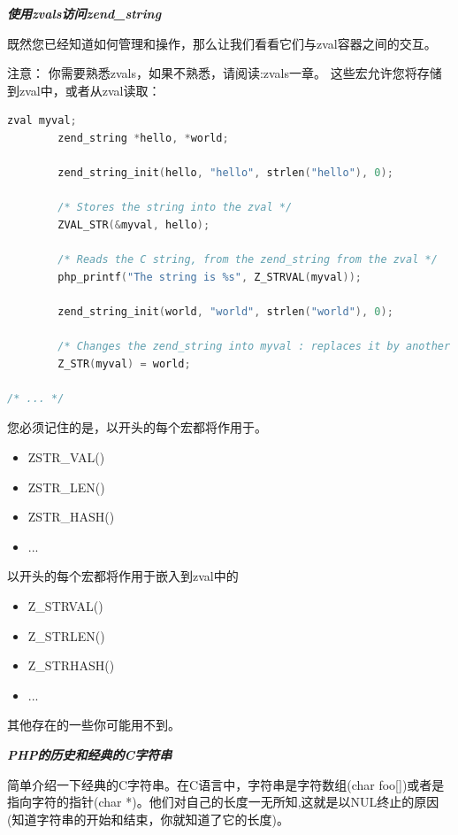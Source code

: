 \textbf{\textit{使用zvals访问zend\_string}}

既然您已经知道如何管理和操作，那么让我们看看它们与zval容器之间的交互。

注意：
你需要熟悉zvals，如果不熟悉，请阅读:zvals一章。
这些宏允许您将存储到zval中，或者从zval读取：

\begin{lstlisting}[language=c]
        zval myval;
        zend_string *hello, *world;

        zend_string_init(hello, "hello", strlen("hello"), 0);

        /* Stores the string into the zval */
        ZVAL_STR(&myval, hello);

        /* Reads the C string, from the zend_string from the zval */
        php_printf("The string is %s", Z_STRVAL(myval));

        zend_string_init(world, "world", strlen("world"), 0);

        /* Changes the zend_string into myval : replaces it by another one */
        Z_STR(myval) = world;

/* ... */
\end{lstlisting} 

您必须记住的是，以开头的每个宏都将作用于。

\begin{itemize}
    \item ZSTR\_VAL()
    \item ZSTR\_LEN()
    \item ZSTR\_HASH()
    \item ...
\end{itemize}

以开头的每个宏都将作用于嵌入到zval中的

\begin{itemize}
        \item Z\_STRVAL()
        \item Z\_STRLEN()
        \item Z\_STRHASH()
        \item ...
\end{itemize}

其他存在的一些你可能用不到。

\textbf{\textit{PHP的历史和经典的C字符串}}

简单介绍一下经典的C字符串。在C语言中，字符串是字符数组(char foo[])或者是指向字符的指针(char *)。他们对自己的长度一无所知,这就是以NUL终止的原因(知道字符串的开始和结束，你就知道了它的长度)。


